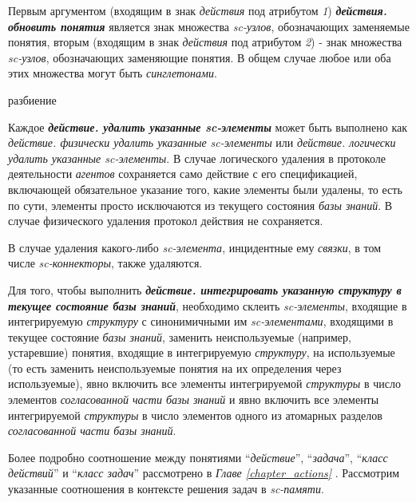 Первым аргументом (входящим в знак \textit{действия} под атрибутом \textit{1\scnrolesign}) \textbf{\textit{действия. обновить понятия}} является знак множества \textit{sc-узлов}, обозначающих заменяемые понятия, вторым (входящим в знак \textit{действия} под атрибутом \textit{2\scnrolesign}) - знак множества \textit{sc-узлов}, обозначающих заменяющие понятия. В общем случае любое или оба этих множества могут быть \textit{синглетонами}.

\begin{SCn}
\begin{scnrelfromset}{разбиение}
\end{scnrelfromset}
\end{SCn}

Каждое \textbf{\textit{действие. удалить указанные sc-элементы}} может быть выполнено как \textit{действие. физически удалить указанные sc-элементы} или \textit{действие. логически удалить указанные sc-элементы}. В случае логического удаления в протоколе деятельности \textit{агентов} сохраняется само действие с его спецификацией, включающей обязательное указание того, какие элементы были удалены, то есть по сути, элементы просто исключаются из текущего состояния \textit{базы знаний}. В случае физического удаления протокол действия не сохраняется.
	
В случае удаления какого-либо \textit{sc-элемента}, инцидентные ему \textit{связки}, в том числе \textit{sc-коннекторы}, также удаляются.

Для того, чтобы выполнить \textbf{\textit{действие. интегрировать указанную структуру в текущее состояние базы знаний}}, необходимо склеить \textit{sc-элементы}, входящие в интегрируемую \textit{структуру} с синонимичными им \textit{sc-элементами}, входящими в текущее состояние \textit{базы знаний}, заменить неиспользуемые (например, устаревшие) понятия, входящие в интегрируемую \textit{структуру}, на используемые (то есть заменить неиспользуемые понятия на их определения через используемые), явно включить все элементы интегрируемой \textit{структуры} в число элементов \textit{согласованной части базы знаний} и явно включить все элементы интегрируемой \textit{структуры} в число элементов одного из атомарных разделов \textit{согласованной части базы знаний}.

Более подробно соотношение между понятиями ``\textit{действие}'', ``\textit{задача}'', ``\textit{класс действий}'' и ``\textit{класс задач}'' рассмотрено в \textit{Главе \ref{chapter_actions} }. Рассмотрим указанные соотношения в контексте решения задач в \textit{sc-памяти}.

